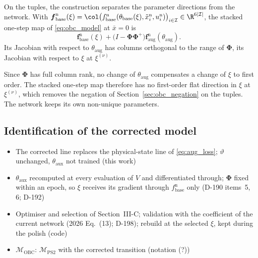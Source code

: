 On the tuples, the construction separates the parameter directions from the
network.
With $\boldsymbol f^{\mathrm n}_{\mathrm{base}}(\xi)
=\col\bigl(f^{\mathrm n}_{\mathrm{base}}(\theta_{\mathrm{base}}(\xi),
\tilde x^{\mathrm n}_i,u^{\mathrm n}_i)\bigr)_{i\in\mathcal I}\in\R^{6|\mathcal I|}$,
the stacked one-step map of \eqref{eq:obc_model} at $\bar x=0$ is
\begin{equation}
 \boldsymbol f^{\mathrm n}_{\mathrm{base}}(\xi)
 +\bigl(I-\boldsymbol\Phi\boldsymbol\Phi^{+}\bigr)
  \boldsymbol f^{\mathrm n}_{\mathrm{aug}}(\theta_{\mathrm{aug}}).
 \label{eq:obc_stack}
\end{equation}
Its Jacobian with respect to $\theta_{\mathrm{aug}}$ has columns orthogonal to
the range of $\boldsymbol\Phi$, its Jacobian with respect to $\xi$ at
$\xi^{(\nu)}$.

Since $\boldsymbol\Phi$ has full column rank, no change of
$\theta_{\mathrm{aug}}$ compensates a change of $\xi$ to first order.
The stacked one-step map therefore has no first-order flat direction in $\xi$
at $\xi^{(\nu)}$, which removes the negation of
Section~\ref{sec:obc_negation} on the tuples.
The network keeps its own non-unique parameters.

\subsection{Identification of the corrected model}\label{sec:obc_ident}
\ifdraft
\begin{itemize}
\item The corrected line replaces the physical-state line of \eqref{eq:aug_loss}; $\vartheta$ unchanged, $\theta_{\mathrm{aux}}$ not trained (this work)
\item $\theta_{\mathrm{aux}}$ recomputed at every evaluation of $V$ and differentiated through; $\boldsymbol\Phi$ fixed within an epoch, so $\xi$ receives its gradient through $f^{\mathrm n}_{\mathrm{base}}$ only (D-190 items~5, 6; D-192)
\item Optimiser and selection of Section~III-C; validation with the coefficient of the current network (2026 Eq.~(13); D-198); rebuild at the selected $\xi$, kept during the polish (code)
\item $\mathcal M_{\mathrm{OBC}}$: $\mathcal M_{\mathrm{PS2}}$ with the corrected transition (notation (?))
\end{itemize}
\fi

